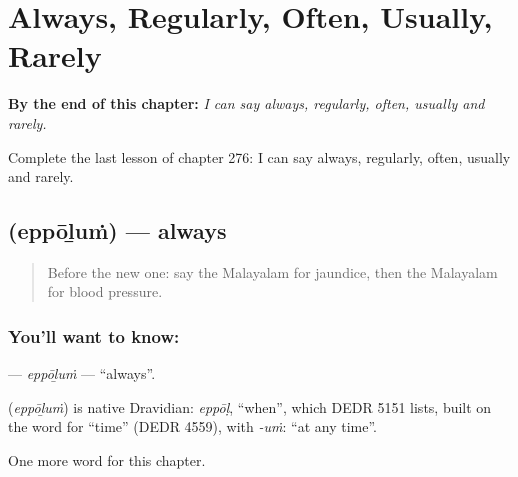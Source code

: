 
\chapter{Always, Regularly, Often, Usually, Rarely}
\label{ch:ml-always-regularly-often-usually-rarely}

\begin{chapteropening}
\textbf{By the end of this chapter:} \emph{I can say always, regularly, often, usually and rarely.}

Complete the last lesson of chapter 276: I can say always, regularly, often, usually and rarely.
\end{chapteropening}

\section[\texorpdfstring{\ml{എപ്പോഴും} (eppōḻuṁ)}{എപ്പോഴും (eppōḻuṁ)}]{ (eppōḻuṁ) — always}

\label{lesson:ML-C276-eppolum}



\begin{quote}
Before the new one: say the Malayalam for jaundice, then the Malayalam for blood pressure.
\end{quote}

\subsection*{You'll want to know: }
\textbf{} — \emph{eppōḻuṁ} — \textquotedblleft{}always\textquotedblright{}.

\begin{cousinweb}
\textbf{} (\emph{eppōḻuṁ}) is native Dravidian: \emph{eppōḷ}, \textquotedblleft{}when\textquotedblright{}, which DEDR 5151 lists, built on the word for \textquotedblleft{}time\textquotedblright{} (DEDR 4559), with \emph{-uṁ}: \textquotedblleft{}at any time\textquotedblright{}.
\end{cousinweb}

\begin{grammarlens}[title={What you've built}]
One more word for this chapter.
\end{grammarlens}

